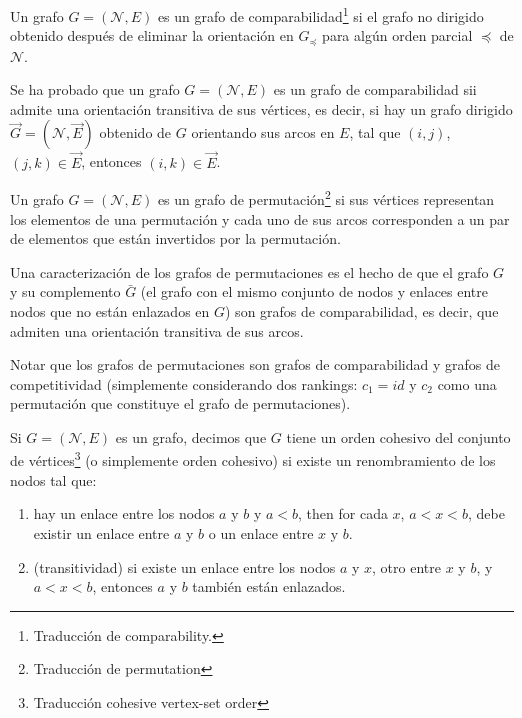 \begin{defi}
Un grafo $G = (\mathcal{N}, E)$ es un grafo de comparabilidad\footnote{Traducción de comparability.} si el grafo no dirigido obtenido después de eliminar la orientación en $G_\preceq$ para algún orden parcial $\preceq$ de $\mathcal{N}$.  
\end{defi}

\begin{defi}
Se ha probado que un grafo $G = (\mathcal{N},E)$ es un grafo de comparabilidad sii admite una orientación transitiva de sus vértices, es decir, si hay un grafo dirigido $\vec{G} = (\mathcal{N}, \vec{E})$ obtenido de $G$ orientando sus arcos en $E$, tal que $(i,j)$, $(j,k) \in \vec{E}$, entonces $(i,k) \in \vec{E}$. 
\end{defi}

\begin{defi}
Un grafo $G = (\mathcal{N}, E)$ es un grafo de permutación\footnote{Traducción de permutation} si sus vértices representan los elementos de una permutación y cada uno de sus arcos corresponden a un par de elementos que están invertidos por la permutación.  
\end{defi}

\begin{nota} \label{nota}
Una caracterización de los grafos de permutaciones es el hecho de que el grafo $G$ y su complemento $\bar{G}$ (el grafo con el mismo conjunto de nodos y enlaces entre nodos que no están enlazados en $G$) son grafos de comparabilidad, es decir, que admiten una orientación transitiva de sus arcos.
\end{nota}

\begin{nota}
Notar que los grafos de permutaciones son grafos de comparabilidad y grafos de competitividad (simplemente considerando dos rankings: $c_1 = id$ y $c_2$ como una permutación que constituye el grafo de permutaciones).
\end{nota}

\begin{defi} \label{cohesivo}
Si $G=(\mathcal{N}, E)$ es un grafo, decimos que $G$ tiene un orden cohesivo del conjunto de vértices\footnote{Traducción cohesive vertex-set order} (o simplemente orden cohesivo) si existe un renombramiento de los nodos tal que:
\begin{enumerate}
\item hay un enlace entre los nodos $a$ y $b$ y $a < b$, then for cada $x$, $a < x < b$, debe existir un enlace entre $a$ y $b$ o un enlace entre $x$ y $b$.
\item (transitividad) si existe un enlace entre los nodos $a$ y $x$, otro entre $x$ y $b$, y $a < x < b$, entonces $a$ y $b$ también están enlazados.
\end{enumerate}
\end{defi}

